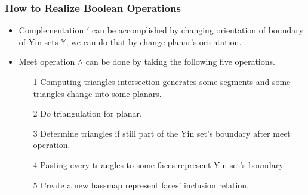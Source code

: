 \documentclass{beamer}
\begin{document}
\begin{frame}
  \frametitle{How to Realize Boolean Operations}
  \begin{itemize}
  \item Complementation $\prime$ can be accomplished by changing orientation of boundary of Yin sets $\mathbb{Y}$,
  we can do that by change planar's orientation. 

    
  \item Meet operation $\wedge$ can be done by taking the following five operations.
    \begin{itemize}
    	\item[1] Computing triangles intersection generates some segments and some triangles change into some planars.
    	\item[2] Do triangulation for planar.
    	\item[3] Determine triangles if still part of the Yin set's boundary after meet operation.
    	\item[4] Pasting every triangles to some faces represent Yin set's boundary.
    	\item[5] Create a new hassmap represent faces' inclusion relation.
    \end{itemize}
   \end{itemize}


    
%
%      
%      
%      
%      
\end{frame}
\end{document}
